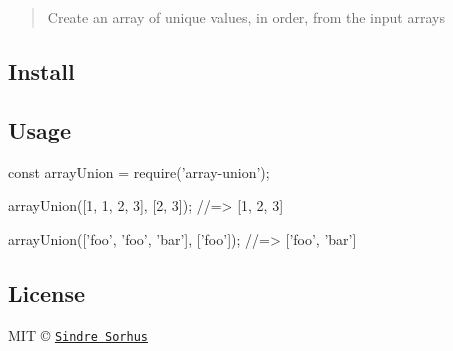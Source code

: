 \begin{quote}
Create an array of unique values, in order, from the input arrays \end{quote}


\subsection*{Install}




\subsection*{Usage}


\begin{DoxyCode}
const arrayUnion = require('array-union');

arrayUnion([1, 1, 2, 3], [2, 3]);
//=> [1, 2, 3]

arrayUnion(['foo', 'foo', 'bar'], ['foo']);
//=> ['foo', 'bar']
\end{DoxyCode}


\subsection*{License}

M\+IT © \href{https://sindresorhus.com}{\tt Sindre Sorhus} 